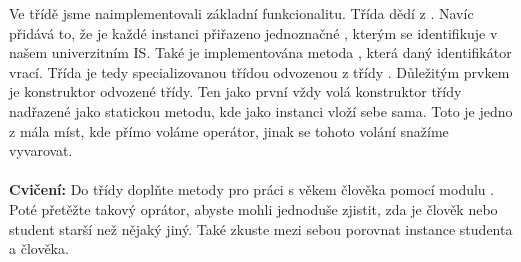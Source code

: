 Ve třídě  jsme naimplementovali základní funkcionalitu. Třída  dědí z .
Navíc přidává to, že je každé instanci přiřazeno jednoznačné , kterým se identifikuje
v našem univerzitním IS. Také je implementována metoda , která daný identifikátor vrací. Třída
 je tedy specializovanou třídou odvozenou z třídy . Důležitým prvkem je
konstruktor odvozené třídy. Ten jako první vždy volá konstruktor třídy nadřazené jako statickou metodu,
kde jako instanci vloží sebe sama. Toto je jedno z mála míst, kde přímo voláme operátor, jinak se
tohoto volání snažíme vyvarovat.
\\
\\
\noindent
{\textbf{Cvičení:}}
Do třídy  doplňte metody pro práci s věkem člověka pomocí modulu .
Poté přetěžte takový oprátor, abyste mohli jednoduše zjistit, zda je člověk nebo student starší než nějaký
jiný. Také zkuste mezi sebou porovnat instance studenta a člověka.



























